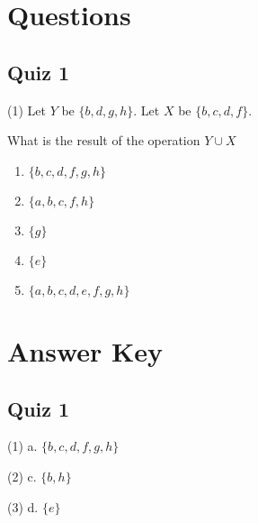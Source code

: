 \documentclass[12pt]{article}
\begin{document}
\section{Questions}

\newpage

\subsection{Quiz 1}


(1) Let $Y$ be $\{b,d,g,h\}$. Let $X$ be
$\{b,c,d,f\}$. 

What is the result of the operation $Y\cup X$ 

\begin{enumerate}
\renewcommand{\theenumi}{\alph{enumi}}

\item $\{b,c,d,f,g,h\}$
\item $\{a,b,c,f,h\}$
\item $\{g\}$
\item$\{e\}$
\item$\{a,b,c,d,e,f,g,h\}$
\end{enumerate}

\newpage

\section{Answer Key}

\newpage

\subsection{Quiz 1}


(1) a. $\{b,c,d,f,g,h\}$

(2) c. $\{b,h\}$

(3) d. $\{e\}$
\end{document}
